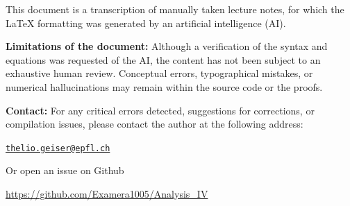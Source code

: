 
\begin{tcolorbox}[colback=red!5!white,colframe=red!75!black,title={\Huge Disclaimer and Responsibility}]
    \large This document is a transcription of manually taken lecture notes, for which the \LaTeX{} formatting was generated by an artificial intelligence (AI). 
    
    \textbf{Limitations of the document:} Although a verification of the syntax and equations was requested of the AI, the content has not been subject to an exhaustive human review. Conceptual errors, typographical mistakes, or numerical hallucinations may remain within the source code or the proofs. 
    
    \textbf{Contact:} For any critical errors detected, suggestions for corrections, or compilation issues, please contact the author at the following address: 
    \begin{center}
        \href{mailto:thelio.geiser@epfl.ch}{\texttt{thelio.geiser@epfl.ch}}
    \end{center}
\centering Or open an issue on Github
\begin{center}
\href{https://github.com/Examera1005/Analysis_IV}{\url{https://github.com/Examera1005/Analysis_IV}}
\end{center}
\end{tcolorbox}
\vspace{1em}
